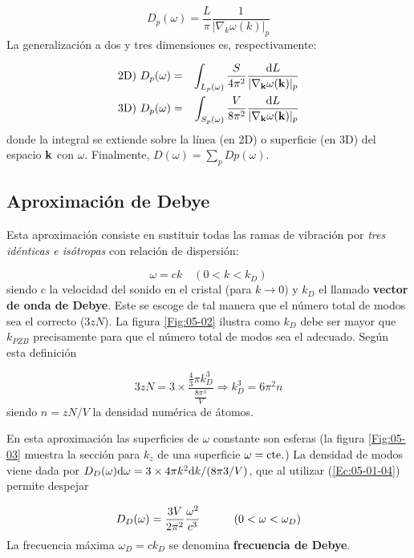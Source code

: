 \begin{equation}
	D_p (\omega)  = \frac{L}{\pi} \frac{1}{|\nabla_ k \omega (k)|_p }
\end{equation}
La generalización a dos y tres dimensiones es, respectivamente:

\begin{eqnarray}
	\text{2D}) \  D_p (\omega) &=& \int_{L_p (\omega)} \frac{S}{4\pi^2} \frac{\mathrm{d} L}{|\nabla_{\mathbf{k}} \omega(\mathbf{k})|_p} \\ 
	\text{3D}) \  D_p (\omega) &=& \int_{S_p (\omega)} \frac{V}{8\pi^2} \frac{\mathrm{d} L}{|\nabla_{\mathbf{k}} \omega(\mathbf{k})|_p} \label{Ec:05-01-04}
\end{eqnarray}
donde la integral se extiende sobre la línea (en 2D) o superficie (en 3D) del espacio $\mathbf{k}$ con $\omega$. Finalmente, $D(\omega)=\sum_p Dp (\omega)$.
 
\subsection{Aproximación de Debye}    

Esta aproximación consiste en sustituir todas las ramas de vibración por \textit{tres idénticas e isótropas} con relación de dispersión:

\begin{equation}
	\omega = c k \quad (0<k<k_D)
\end{equation}
siendo $c$ la velocidad del sonido en el cristal (para $k\rightarrow 0$) y $k_D$ el llamado \textbf{vector de onda de Debye}. Este se escoge de tal manera que el número total de modos sea el correcto ($3zN$). La figura \ref{Fig:05-02} ilustra como $k_D$ debe ser mayor que $k_{PZB}$ precisamente para que el número total de modos sea el adecuado. Según esta definición

\begin{equation}
	3zN = 3 \times \frac{\frac{4}{3} \pi k^3_D}{\frac{8 \pi^3}{V}} \Rightarrow k_D^3 = 6 \pi^2 n
\end{equation}
siendo $n=zN/V$ la densidad numérica de átomos. 

En esta aproximación las superficies de $\omega$ constante son esferas (la figura \ref{Fig:05-03} muestra la sección para $k_z$ de una superficie $\omega=\text{cte}.$) La densidad de modos viene dada por $D_D(\omega) \mathrm{d} \omega = 3 \times 4 \pi k^2 \mathrm{d} k / (8\pi3 /V)$, que al utilizar (\ref{Ec:05-01-04}) permite despejar 

\begin{equation}
	D_D (\omega) = \frac{3V}{2\pi^2} \frac{\omega^2}{c^3} \quad \quad \quad (0<\omega<\omega_D)
    \label{Ec:05-01-07}
\end{equation}
La frecuencia máxima $\omega_D=ck_D$ se denomina \textbf{frecuencia de Debye}. 


